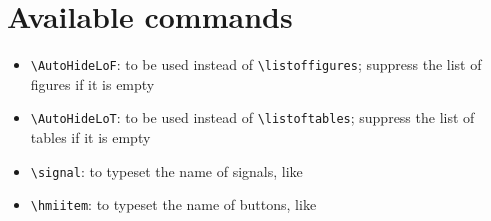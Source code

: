 \documentclass[a4paper,article]{e4esslayout}
\begin{document}
\section{Available commands}
\label{sec:ava-com}
\begin{itemize}
	\item \verb^\AutoHideLoF^: to be used instead of \verb^\listoffigures^; suppress the list of figures if it is empty
	\item \verb^\AutoHideLoT^: to be used instead of \verb^\listoftables^; suppress the list of tables if it is empty
\end{itemize}

\begin{itemize}
	\item \verb^\signal^: to typeset the name of signals, like 
	\item \verb^\hmiitem^: to typeset the name of buttons, like 
\end{itemize}
\end{document}
